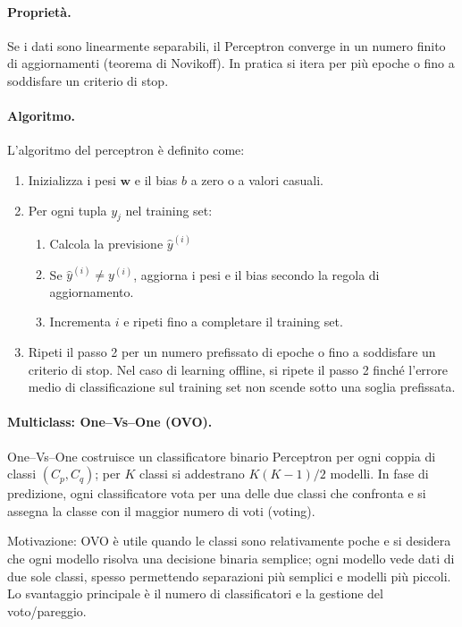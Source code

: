 \paragraph{Proprietà.}
Se i dati sono linearmente separabili, il Perceptron converge in un numero finito di aggiornamenti (teorema di Novikoff). In pratica si itera per più epoche o fino a soddisfare un criterio di stop.

\paragraph{Algoritmo.}
L'algoritmo del perceptron è definito come:
\begin{enumerate}
  \item Inizializza i pesi $\mathbf{w}$ e il bias $b$ a zero o a valori casuali.
  \item Per ogni tupla $y_j$ nel training set:
  \begin{enumerate}
    \item Calcola la previsione $\hat{y}^{(i)}$
    \item Se $\hat{y}^{(i)}\neq y^{(i)}$, aggiorna i pesi e il bias secondo la regola di aggiornamento.
    \item Incrementa $i$ e ripeti fino a completare il training set.
  \end{enumerate}
  \item Ripeti il passo 2 per un numero prefissato di epoche o fino a soddisfare un criterio di stop. Nel caso di learning offline, si ripete il passo 2 finché l'errore medio di classificazione sul training set non scende sotto una soglia prefissata.
\end{enumerate}

\paragraph{Multiclass: One–Vs–One (OVO).}
One–Vs–One costruisce un classificatore binario Perceptron per ogni coppia di classi $(C_p,C_q)$; per $K$ classi si addestrano $K(K-1)/2$ modelli. In fase di predizione, ogni classificatore vota per una delle due classi che confronta e si assegna la classe con il maggior numero di voti (voting).

Motivazione: OVO è utile quando le classi sono relativamente poche e si desidera che ogni modello risolva una decisione binaria semplice; ogni modello vede dati di due sole classi, spesso permettendo separazioni più semplici e modelli più piccoli. Lo svantaggio principale è il numero di classificatori e la gestione del voto/pareggio.

